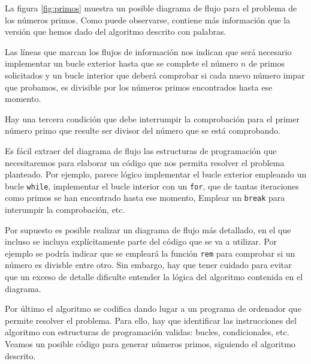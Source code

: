 La figura \ref{fig:primos} muestra un posible diagrama de flujo para el problema de los números primos. Como puede observarse, contiene más información que la versión que hemos dado del algoritmo descrito con palabras. 

Las líneas que marcan los flujos de información nos indican que será necesario implementar un bucle exterior hasta que se complete el número $n$ de primos solicitados y un bucle interior que deberá comprobar si cada nuevo número impar que probamos, es divisible por los números primos encontrados hasta ese momento.

Hay una tercera condición que debe interrumpir la comprobación para el primer número primo que resulte ser divisor del número que se está comprobando.

Es fácil extraer del diagrama de flujo las estructuras de programación que necesitaremos para elaborar un código que nos permita resolver el problema planteado. Por ejemplo, parece lógico implementar el bucle exterior empleando un bucle \texttt{while}, implementar el bucle interior con un \texttt{for}, que de tantas iteraciones como primos se han encontrado hasta ese momento, Emplear un \texttt{break} para interumpir la comprobación, etc.

Por supuesto es posible realizar un diagrama de flujo más detallado, en el que incluso se incluya explícitamente parte del código que se va a utilizar. Por ejemplo se podría indicar que se empleará la función \texttt{rem} para comprobar si un número es divisble entre otro. Sin embargo, hay que tener cuidado para evitar que un exceso de detalle dificulte entender la lógica del algoritmo contenida en el diagrama.

Por último el algoritmo se codifica dando lugar a un programa de ordenador que permite resolver el problema. Para ello, hay que identificar las instrucciones del algoritmo con estructuras de programación validas: bucles, condicionales, etc. Veamos un posible código para generar números primos, siguiendo el algoritmo descrito. 

